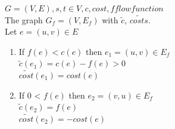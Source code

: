 \begin{definition}
$G=(V,E), s, t \in V, c, cost, f flowfunction$\\
The graph $G{_f}=(V,E{_f})$ with $\tilde{c}$, $\tilde{costs}$.\\
Let $e=(u,v) \in E$
\begin{enumerate}
  \item If $f(e) < c(e)$ then $e{_1}=(u,v) \in E{_f}$\\
  $\tilde{c}(e{_1}) = c(e) - f(e) > 0 $\\
  $\tilde{cost}(e{_1}) =  cost(e)$\\
  \item If 0 < $f(e)$ then $e{_2}=(v,u) \in E{_f}$\\
   $\tilde{c}(e{_2}) = f(e)$\\
   $\tilde{cost}(e{_2}) =  - cost(e)$\\
\end{enumerate}
\end{definition}

